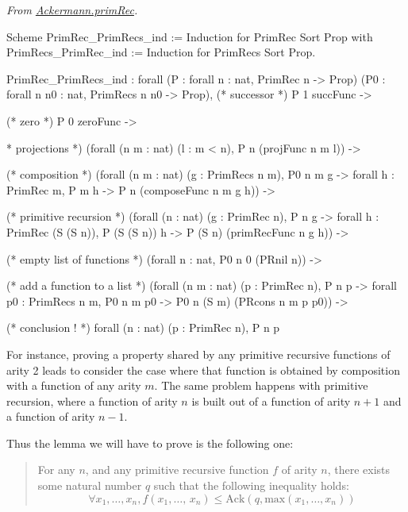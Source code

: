 \vspace{4pt}
\noindent
\emph{From \href{../theories/html/hydras.Ackermann.primRec.html}{Ackermann.primRec}.}

\begin{Coqsrc}
Scheme PrimRec_PrimRecs_ind := Induction for PrimRec
  Sort Prop
  with PrimRecs_PrimRec_ind := Induction for PrimRecs 
  Sort Prop.
\end{Coqsrc}

\begin{Coqanswer}
PrimRec_PrimRecs_ind :
forall (P : forall n : nat, PrimRec n -> Prop)
  (P0 : forall n n0 : nat, PrimRecs n n0 -> Prop),
(* successor *)
P 1 succFunc ->

(* zero *)
P 0 zeroFunc ->

* projections *)
(forall (n m : nat) (l : m < n), P n (projFunc n m l)) ->

(* composition *) 
(forall (n m : nat) (g : PrimRecs n m),
      P0 n m g -> forall h : PrimRec m, P m h -> 
      P n (composeFunc n m g h)) ->

(* primitive recursion *)
(forall (n : nat) (g : PrimRec n),
 P n g ->
    forall h : PrimRec (S (S n)), P (S (S n)) h -> 
     P (S n) (primRecFunc n g h)) ->

(* empty list of functions *)
(forall n : nat, P0 n 0 (PRnil n)) ->

(* add a function to a list *)
(forall (n m : nat) (p : PrimRec n),
   P n p -> 
   forall p0 : PrimRecs n m, P0 n m p0 -> 
   P0 n (S m) (PRcons n m p p0)) ->

(* conclusion ! *)
forall (n : nat) (p : PrimRec n), P n p
\end{Coqanswer}

For instance, proving a property shared by any primitive recursive functions of arity 2 leads to consider the case where that function is obtained by composition with a function of any 
arity $m$. The same problem happens with primitive 
recursion, where a function of arity $n$ is built out of a function of arity $n+1$ and a function of arity $n-1$.

Thus the lemma we will have to prove is the following one:


  \begin{quote}
    For any $n$, and any primitive recursive function $f$ of  arity $n$, there exists some natural number $q$ such that the following inequality holds:
 \[
  \forall x_1,\dots,x_n, 
      f(x_1,\dots,\,x_n)\leq\textrm{Ack}(q,\textrm{max}(x_1,\dots,x_n))
\]
 \end{quote}


